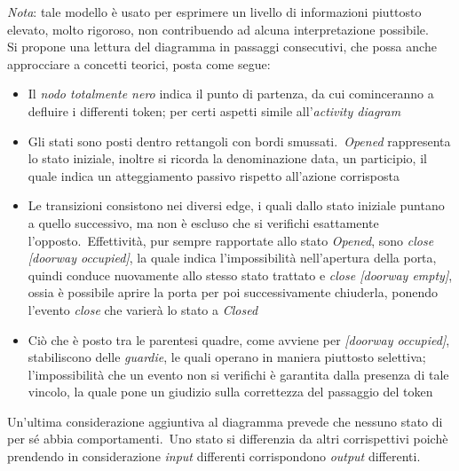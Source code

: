 \documentclass{article}
\begin{document}
\textit{Nota}: tale modello è usato per esprimere un livello di informazioni piuttosto elevato, molto rigoroso, non contribuendo ad alcuna interpretazione possibile.\vspace*{14pt}\\
Si propone una lettura del diagramma in passaggi consecutivi, che possa anche approcciare a concetti teorici, posta come segue:
\begin{itemize}[label={-}]
    \itemsep0em
    \item Il \textit{nodo totalmente nero} indica il punto di partenza, da cui cominceranno a defluire i differenti token; per certi aspetti simile all'\textit{activity diagram}
    \item Gli stati sono posti dentro rettangoli con bordi smussati.\ \textit{Opened} rappresenta lo stato iniziale, inoltre si ricorda la denominazione data, un participio, il quale indica un atteggiamento passivo rispetto all'azione corrisposta
    \item Le transizioni consistono nei diversi edge, i quali dallo stato iniziale puntano a quello successivo, ma non è escluso che si verifichi esattamente l'opposto.\ Effettività, pur sempre rapportate allo stato \textit{Opened}, sono \textit{close [doorway occupied]}, la quale indica l'impossibilità nell'apertura della porta, quindi conduce nuovamente allo stesso stato trattato e \textit{close [doorway empty]}, ossia è possibile aprire la porta per poi successivamente chiuderla, ponendo l'evento \textit{close} che varierà lo stato a \textit{Closed} 
    \item Ciò che è posto tra le parentesi quadre, come avviene per \textit{[doorway occupied]}, stabiliscono delle \textit{guardie}, le quali operano in maniera piuttosto selettiva; l'impossibilità che un evento non si verifichi è garantita dalla presenza di tale vincolo, la quale pone un giudizio sulla correttezza del passaggio del token
\end{itemize}
Un'ultima considerazione aggiuntiva al diagramma prevede che nessuno stato di per sé abbia comportamenti.\ Uno stato si differenzia da altri corrispettivi poichè prendendo in considerazione \textit{input} differenti corrispondono \textit{output} differenti.
\end{document}
